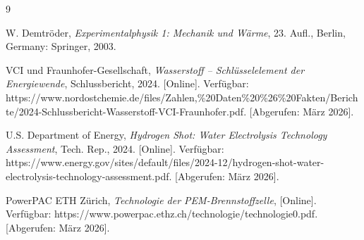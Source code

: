 \documentclass[11pt,a4paper]{article}
\numberwithin{equation}{section}
\begin{document}
\begin{thebibliography}{9}

W. Demtröder, \emph{Experimentalphysik 1: Mechanik und Wärme}, 23. Aufl., 
Berlin, Germany: Springer, 2003.

VCI und Fraunhofer-Gesellschaft, \emph{Wasserstoff -- Schlüsselelement der Energiewende}, 
Schlussbericht, 2024. [Online]. Verfügbar: 
https://www.nordostchemie.de/files/Zahlen,\%20Daten\%20\%26\%20Fakten/Berichte/2024-Schlussbericht-Wasserstoff-VCI-Fraunhofer.pdf. 
[Abgerufen: März 2026].

U.S. Department of Energy, \emph{Hydrogen Shot: Water Electrolysis Technology Assessment}, 
Tech. Rep., 2024. [Online]. Verfügbar: 
https://www.energy.gov/sites/default/files/2024-12/hydrogen-shot-water-electrolysis-technology-assessment.pdf. 
[Abgerufen: März 2026].

PowerPAC ETH Zürich, \emph{Technologie der PEM-Brennstoffzelle}, [Online]. Verfügbar: 
https://www.powerpac.ethz.ch/technologie/technologie0.pdf. 
[Abgerufen: März 2026].

\end{thebibliography}
\end{document}
